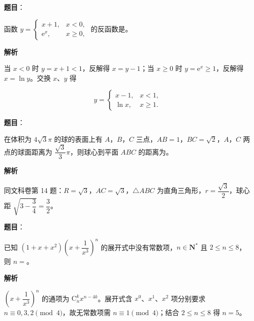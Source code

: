 \begin{answer}

\textbf{题目}：

函数 $y=\begin{cases}x+1,&x<0,\\ \mathrm e^x,&x\geqslant0,\end{cases}$ 的反函数是\gkblank{}。

\textbf{解析}

当 $x<0$ 时 $y=x+1<1$，反解得 $x=y-1$；当 $x\geqslant0$ 时 $y=\mathrm e^x\geqslant1$，反解得 $x=\ln y$。交换 $x$、$y$ 得

\nopagebreak[4]
\[y=\begin{cases}x-1,&x<1,\\ \ln x,&x\geqslant1.\end{cases}\]


\end{answer}
\begin{answer}

\textbf{题目}：

在体积为 $4\sqrt3\pi$ 的球的表面上有 $A$，$B$，$C$ 三点，$AB=1$，$BC=\sqrt2$，$A$，$C$ 两点的球面距离为 $\dfrac{\sqrt3}{3}\pi$，则球心到平面 $ABC$ 的距离为\gkblank{}。

\textbf{解析}

同文科卷第 14 题：$R=\sqrt3$，$AC=\sqrt3$，$\triangle ABC$ 为直角三角形，$r=\dfrac{\sqrt3}2$，球心距 $\sqrt{3-\dfrac34}=\dfrac32$。


\end{answer}
\begin{answer}

\textbf{题目}：

已知 $\left(1+x+x^2\right)\left(x+\dfrac1{x^3}\right)^n$ 的展开式中没有常数项，$n\in\mathbf N^*$ 且 $2\leqslant n\leqslant8$，则 $n=$\gkblank{}。

\textbf{解析}

$\left(x+\dfrac1{x^3}\right)^n$ 的通项为 $\mathrm C_n^kx^{n-4k}$。展开式含 $x^0$、$x^1$、$x^2$ 项分别要求 $n\equiv0,3,2\pmod 4$，故无常数项需 $n\equiv1\pmod4$；结合 $2\leqslant n\leqslant8$ 得 $n=5$。


\end{answer}
